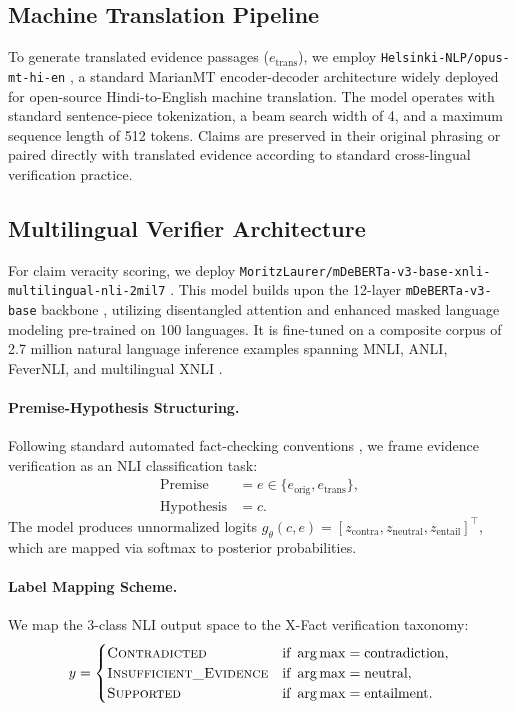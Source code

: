 \subsection{Machine Translation Pipeline}
To generate translated evidence passages ($e_{\text{trans}}$), we employ \texttt{Helsinki-NLP/opus-mt-hi-en} \citep{tiedemann-thottingal-2020-opus}, a standard MarianMT encoder-decoder architecture widely deployed for open-source Hindi-to-English machine translation. The model operates with standard sentence-piece tokenization, a beam search width of 4, and a maximum sequence length of 512 tokens. Claims are preserved in their original phrasing or paired directly with translated evidence according to standard cross-lingual verification practice.

\subsection{Multilingual Verifier Architecture}
For claim veracity scoring, we deploy \texttt{MoritzLaurer/mDeBERTa-v3-base-xnli-multilingual-nli-2mil7} \citep{laurer-etal-2024-less}. This model builds upon the 12-layer \texttt{mDeBERTa-v3-base} backbone \citep{he-etal-2021-deberta}, utilizing disentangled attention and enhanced masked language modeling pre-trained on 100 languages. It is fine-tuned on a composite corpus of 2.7 million natural language inference examples spanning MNLI, ANLI, FeverNLI, and multilingual XNLI \citep{conneau-etal-2020-unsupervised}.

\paragraph{Premise-Hypothesis Structuring.}
Following standard automated fact-checking conventions \citep{thorne-etal-2018-fever,shcharbakova-etal-2025-scale}, we frame evidence verification as an NLI classification task:
\begin{align}
    \text{Premise} &= e \in \{e_{\text{orig}}, e_{\text{trans}}\}, \\
    \text{Hypothesis} &= c.
\end{align}
The model produces unnormalized logits $g_\theta(c, e) = [z_{\text{contra}}, z_{\text{neutral}}, z_{\text{entail}}]^\top$, which are mapped via softmax to posterior probabilities.

\paragraph{Label Mapping Scheme.}
We map the 3-class NLI output space to the X-Fact verification taxonomy:
\begin{equation}
    y = \begin{cases}
        \textsc{Contradicted} & \text{if } \arg\max = \text{contradiction}, \\
        \textsc{Insufficient\_Evidence} & \text{if } \arg\max = \text{neutral}, \\
        \textsc{Supported} & \text{if } \arg\max = \text{entailment}.
    \end{cases}
\end{equation}


